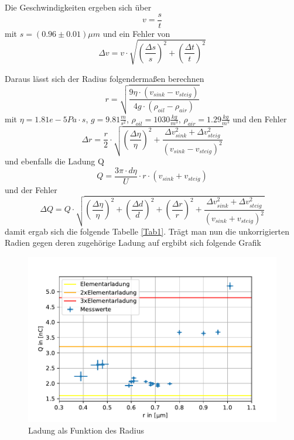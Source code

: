 \documentclass{scrartcl}
\begin{document}
            Die Geschwindigkeiten ergeben sich über
            \begin{equation}
                v = \frac{s}{t}
            \end{equation}
            mit $s = (0.96 \pm 0.01) \mu m$ und ein Fehler von
            \begin{equation}
                \Delta v = v \cdot \sqrt{(\frac{\Delta s}{s})^2 + (\frac{\Delta t}{t})^2} 
            \end{equation}

            Daraus lässt sich der Radius folgendermaßen berechnen
            \begin{equation}
                r = \sqrt{\frac{9\eta \cdot (v_{sink}-v_{steig})}{4 g \cdot (\rho_{oil}-\rho_{air})}}
            \end{equation}
            mit $\eta = 1.81e-5 Pa\cdot s$, $g=9.81 \frac{m}{s^2}$, $\rho_{oil} = 1030 \frac{kg}{m^3}$, $\rho_{air} = 1.29 \frac{kg}{m^3}$
            und den Fehler
            \begin{equation}
                \Delta r = \frac{r}{2} \cdot \sqrt{(\frac{\Delta \eta}{\eta})^2+\frac{\Delta v_{sink}^2+\Delta v_{steig}^2}{(v_{sink}-v_{steig})^2}}
            \end{equation}
            und ebenfalls die Ladung Q
            \begin{equation}
                Q = \frac{3\pi \cdot d\eta}{U} \cdot r \cdot (v_{sink}+v_{steig})
            \end{equation}
            und der Fehler
            \begin{equation}
                \Delta Q = Q \cdot \sqrt{(\frac{\Delta \eta}{\eta})^2 + (\frac{\Delta d}{d})^2+(\frac{\Delta r}{r})^2 + \frac{\Delta v_{sink}^2 + \Delta v_{steig}^2}{(v_{sink} + v_{steig})^2}}
            \end{equation}
            damit ergab sich die folgende Tabelle \ref{Tab1}.
            Trägt man nun die unkorrigierten Radien gegen deren zugehörige Ladung auf ergbibt sich folgende Grafik
            \begin{figure}[H]
                \centering
                \includegraphics[width=1.0\textwidth]{QoverRUncorr.pdf}
                \caption{Ladung als Funktion des Radius}
            \end{figure}
\end{document}
